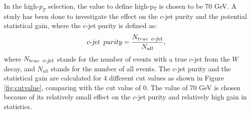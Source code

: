 \documentclass[letterpaper,12pt]{article}
\newcommand\cjetineq{\mathop{\mbox{$c$-$\mathit{jet}$}}}
\newcommand\cjetunder{\mathop{\footnotesize{\mbox{$c$-$\mathit{jet}$}}}\normalsize}
\begin{document}
In the high-$p_{T}$ selection, the value to define high-p$_{T}$ is 
chosen to be 70 GeV. A study has been done to investigate the effect 
on the $c$-jet purity and the potential statistical gain, where the $c$-jet purity is defined as:
\begin{equation}
\cjetineq\ purity = \frac{N_{true\ \cjetunder}}{N_{all}},
\end{equation}
where $N_{true\ \cjetunder}$ stands for the number of events with a 
true $c$-jet from the $W$ decay, and $N_{all}$ stands for the number of all events. 
The $c$-jet purity and the statistical gain are calculated for 4 different cut 
values as shown in Figure \ref{fig:cutvalue}, comparing with the cut value of 0. 
The value of 70 GeV is chosen because of its relatively small effect on the $c$-jet 
purity and relatively high gain in statistics. 
\end{document}
